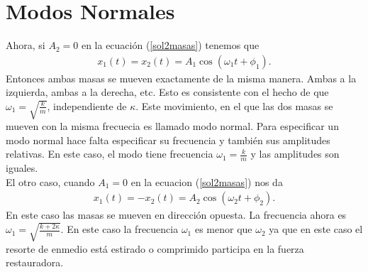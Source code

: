 \documentclass[letterpaper,12pt,oneside]{book}
\begin{document}
\section{Modos Normales}
Ahora, si $A_2 = 0$ en la ecuaci\'on (\ref{sol2masas}) tenemos que
%
\begin{eqnarray}
x_1(t)=x_2(t)=A_1\cos(\omega_1 t + \phi_1).
\end{eqnarray}
%
Entonces ambas masas se mueven exactamente de la misma manera. Ambas a la izquierda, ambas a la derecha, etc. Esto es consistente con el hecho de que $\omega_1 = \sqrt{\frac{k}{m}}$, independiente de $\kappa$. Este movimiento, en el que las dos masas se mueven con la misma frecuecia es llamado modo normal. Para especificar un modo normal hace falta especificar su frecuencia y tambi\'en sus amplitudes relativas. En este caso, el modo tiene frecuencia $\omega_1 = \frac{k}{m}$ y las amplitudes son iguales.\\
El otro caso, cuando $A_1=0$ en la ecuacion (\ref{sol2masas}) nos da
%
\begin{eqnarray}
x_1(t)=-x_2(t)=A_2\cos(\omega_2 t + \phi_2).
\end{eqnarray}
%
En este caso las masas se mueven en direcci\'on opuesta. La frecuencia ahora es $\omega_1 = \sqrt{\frac{k+2\kappa}{m}}$. En este caso la frecuencia $\omega_1$ es menor que $\omega_2$ ya que en este caso el resorte de enmedio est\'a estirado o comprimido participa en la fuerza restauradora. 
%
\end{document}
